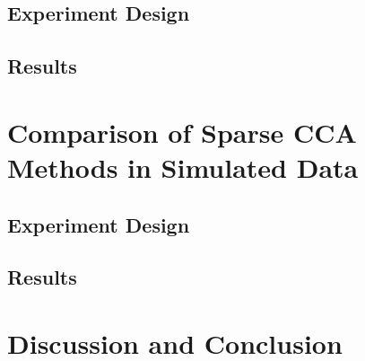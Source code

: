 \subsection{Experiment Design}
\subsection{Results}

\section{Comparison of Sparse CCA Methods in Simulated Data}
\subsection{Experiment Design}
\subsection{Results}


\section{Discussion and Conclusion}


